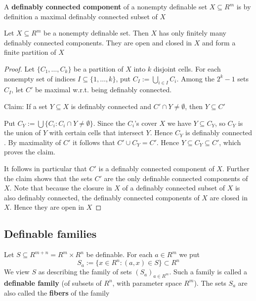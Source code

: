 \documentclass[11pt]{article}
\begin{document}
A \textbf{definably connected component} of a nonempty definable set \(X\subseteq R^m\) is by definition a maximal
definably connected subset of \(X\)

\begin{proposition}[]
Let \(X\subseteq R^m\) be a nonempty definable set. Then \(X\) has only finitely many definably connected
components. They are open and closed in \(X\) and form a finite partition of \(X\)
\end{proposition}

\begin{proof}
Let \(\{C_1,\dots,C_k\}\) be a partition of \(X\) into \(k\) disjoint cells. For each nonempty set of
indices \(I\subseteq\{1,\dots,k\}\), put \(C_I:=\bigcup_{i\in I}C_i\). Among the \(2^k-1\) sets \(C_I\), let \(C'\) be
maximal w.r.t. being definably connected.

Claim: If a set \(Y\subseteq X\) is definably connected and \(C'\cap Y\neq\emptyset\), then \(Y\subseteq C'\)

Put \(C_Y:=\bigcup\{C_i:C_i\cap Y\neq\emptyset\}\). Since the \(C_i\)'s cover \(X\) we have \(Y\subseteq C_Y\), so \(C_Y\)
is the union of \(Y\) with certain cells that intersect \(Y\). Hence \(C_Y\) is definably
connected \label{Problem2}. By maximality of \(C'\) it follows that \(C'\cup C_Y=C'\).
Hence \(Y\subseteq C_Y\subseteq C'\), which proves the claim.

It follows in particular that \(C'\) is a definably connected component of \(X\). Further the
claim shows that the sets \(C'\) are the only definable connected components of \(X\). Note that
because the closure in \(X\) of a definably connected subset of \(X\) is also definably
connected, the definably connected components of \(X\) are closed in \(X\). Hence they are open
in \(X\)
\end{proof}

\subsection{Definable families}
\label{sec:orge160a7d}
Let \(S\subseteq R^{m+n}=R^m\times R^n\) be definable. For each \(a\in R^m\) we put
\begin{equation*}
S_a:=\{x\in R^n:(a,x)\in S\}\subset R^n
\end{equation*}
We view \(S\) as describing the family of sets \((S_a)_{a\in R^m}\). Such a family is called a
\textbf{definable family} (of subsets of \(R^n\), with parameter space \(R^m\)). The sets \(S_a\) are also
called the \textbf{fibers} of the family
\end{document}
